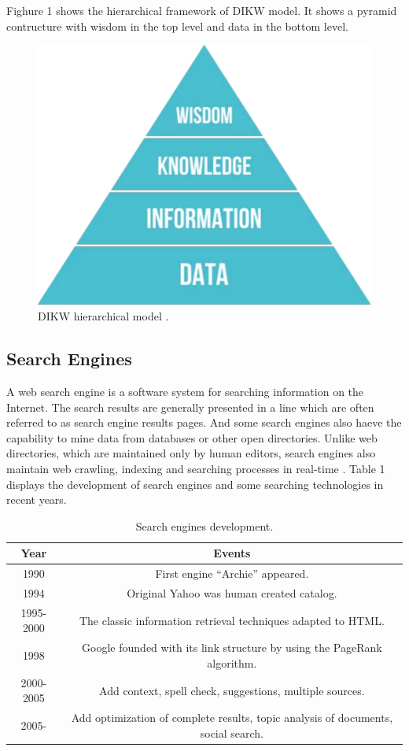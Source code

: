 \documentclass[sigconf]{acmart}
\begin{document}
Fighure 1 shows the hierarchical framework of DIKW model. It shows a pyramid contructure with wisdom in the top level and data in the bottom level.
\begin{figure}
\includegraphics[width=0.30\columnwidth]{images/DIKW_Pyramid}
\caption{DIKW hierarchical model \cite{editor06}.}
\end{figure}

\subsection{Search Engines}

A web search engine is a software system for searching information on the Internet. The search results are generally presented in a line which are often referred to as search engine results pages. And some search engines also haeve the capability to mine data from databases or other open directories. Unlike web directories, which are maintained only by human editors, search engines also maintain web crawling, indexing and searching processes in real-time \cite{editor05}. Table 1 displays the development of search engines and some searching technologies in recent years.
\begin{table}
\centering
\begin{tabular}{|c|c|} \hline
\textsf{Year} & \textsf{Events} \\ \hline
1990 & First engine ``Archie'' appeared. \\ \hline
1994 & Original Yahoo was human created catalog. \\ \hline
1995-2000 & The classic information retrieval techniques adapted to HTML. \\ \hline 
1998 & Google founded with its link structure by using the PageRank algorithm. \\ \hline
2000-2005 & Add context, spell check, suggestions, multiple sources. \\ \hline
2005- & Add optimization of complete results, topic analysis of documents, social search. \\ \hline
\end{tabular}
\caption{Search engines development.}
\end{table}
\end{document}
